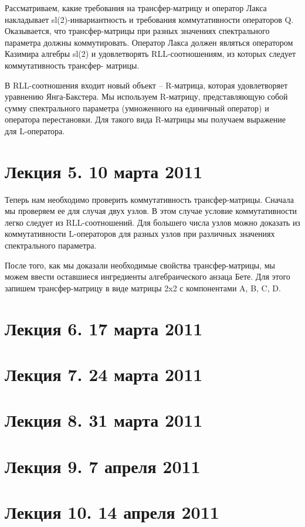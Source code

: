 \documentclass[a4paper,12pt]{article}
\theoremstyle{definition} \newtheorem{Def}{Definition}
\theoremstyle{definition}
\begin{document}
Рассматриваем, какие требования на трансфер-матрицу и оператор Лакса накладывает sl(2)-инвариантность и требования коммутативности операторов Q. Оказывается, что трансфер-матрицы при разных значениях спектрального параметра должны коммутировать. Оператор Лакса должен являться оператором Казимира алгебры sl(2) и удовлетворять RLL-соотношениям, из которых следует коммутативность трансфер- матрицы. 

В RLL-соотношения входит новый объект -- R-матрица, которая удовлетворяет уравнению Янга-Бакстера. Мы используем R-матрицу, представляющую собой сумму спектрального параметра (умноженного на единичный оператор) и оператора перестановки. 
Для такого вида R-матрицы мы получаем выражение для L-оператора.

\section{Лекция 5. 10 марта 2011}

Теперь нам необходимо проверить коммутативность трансфер-матрицы. 
Сначала мы проверяем ее для случая двух узлов. В этом случае условие коммутативности легко следует из RLL-соотношений. Для большего числа узлов можно доказать из коммутативности L-операторов для разных узлов при различных значениях спектрального параметра. 

После того, как мы доказали необходимые свойства трансфер-матрицы, мы можем ввести оставшиеся ингредиенты алгебраического анзаца Бете. Для этого запишем трансфер-матрицу в виде матрицы 2x2 с компонентами A, B, C, D. 
\section{Лекция 6. 17 марта 2011}

\section{Лекция 7. 24 марта 2011}

\section{Лекция 8. 31 марта 2011}

\section{Лекция 9. 7 апреля 2011}

\section{Лекция 10. 14 апреля 2011}



{}

\end{document}
